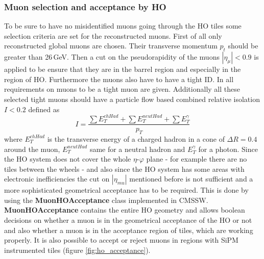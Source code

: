 		\subsubsection{Muon selection and acceptance by HO}
		\label{thesectionhere}
			To be sure to have no misidentified muons going through the HO tiles some selection criteria are set for the reconstructed muons.
			First of all only reconstructed global muons are chosen.
			Their transverse momentum $p_t$ should be greater than 26\,GeV.
			Then a cut on the pseudorapidity of the muons $|\eta_\mu| < 0.9$ is applied to be ensure that they are in the barrel region and especially in the region of HO.
			Furthermore the muons also have to have a tight ID.
			In \cite{CMS-PAPER-MUO-10-004} all requirements on muons to be a tight muon are given.
			Additionally all these selected tight muons should have a particle flow based combined relative isolation $I<0.2$ defined as
			\begin{equation}
				I = \frac{\sum{E_T^{chHad}} + \sum{E_T^{neutHad}} + \sum{E_T^\gamma}}{p_T}
			\end{equation}
			where $E_T^{chHad}$ is the transverse energy of a charged hadron in a cone of $\Delta R = 0.4$ around the muon, $E_T^{neutHad}$ same for a neutral hadron and $E_T^\gamma$ for a photon.
			Since the HO system does not cover the whole $\eta$-$\varphi$ plane - for example there are no tiles between the wheels - and also since the HO system has some areas with electronic inefficiencies the
			cut on $|\eta_{mu}|$ mentioned before is not sufficient and a more sophisticated geometrical acceptance has to be required.
			This is done by using the \textbf{MuonHOAcceptance} class implemented in CMSSW.
			\textbf{MuonHOAcceptance} contains the entire HO geometry and allows boolean decisions on whether a muon is in the geometrical acceptance of the HO or not and also whether a muon is in the
			acceptance region of tiles, which are working properly.
			It is also possible to accept or reject muons in regions with SiPM instrumented tiles (figure \ref{fig:ho_acceptance}).
